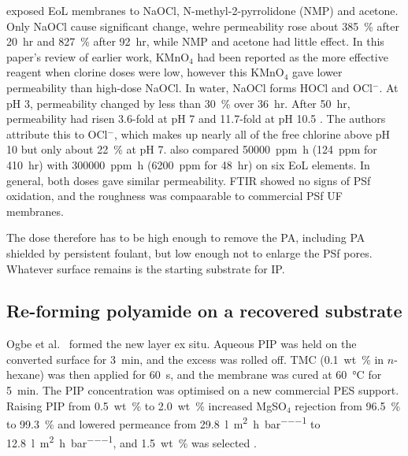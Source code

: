\citet{GarciaPacheco2015} exposed EoL membranes to NaOCl, N-methyl-2-pyrrolidone (NMP) and acetone. Only NaOCl cause significant change, wehre permeability rose about \qty{385}{\percent} after \qty{20}{hr} and \qty{827}{\percent} after \qty{92}{hr}, while NMP and acetone had little effect. In this paper's review of earlier work, KMnO$_4$ had been reported as the more effective reagent when clorine doses were low, however this KMnO$_4$ gave lower permeability than high-dose NaOCl. 
In water, NaOCl forms HOCl and OCl$^-$. At pH 3, permeability changed by less than \qty{30}{\percent} over \qty{36}{hr}. After \qty{50}{hr}, permeability had risen 3.6-fold at pH 7 and 11.7-fold at pH 10.5 \citep{GarciaPacheco2015}. The authors attribute this to OCl$^-$, which makes up nearly all of the free chlorine above pH 10 but only about \qty{22}{\percent} at pH 7.
\citet{Molinaa2018} also compared \qty{50000}{ppm.h} (\qty{124}{ppm} for \qty{410}{hr}) with \qty{300000}{ppm.h} (\qty{6200}{ppm} for \qty{48}{hr}) on six EoL elements. In general, both doses gave similar permeability. FTIR showed no signs of PSf oxidation, and the roughness was compaarable to commercial PSf UF membranes. 

The dose therefore has to be high enough to remove the PA, including PA shielded by persistent foulant, but low enough not to enlarge the PSf pores. Whatever surface remains is the starting substrate for IP.

\subsection{Re-forming polyamide on a recovered substrate}
Ogbe et al.\ \citep{Ogbe2025} formed the new layer ex situ. Aqueous PIP was held on the converted surface for \qty{3}{min}, and the excess was rolled off. TMC (\qty{0.1}{wt\percent} in $n$-hexane) was then applied for \qty{60}{\second}, and the membrane was cured at \qty{60}{\celsius} for \qty{5}{min}. The PIP concentration was optimised on a new commercial PES support. Raising PIP from \qty{0.5}{wt\percent} to \qty{2.0}{wt\percent} increased MgSO$_4$ rejection from \qty{96.5}{\percent} to \qty{99.3}{\percent} and lowered permeance from \qty{29.8}{\litre\per\square\metre\per\hour\per\bar} to \qty{12.8}{\litre\per\square\metre\per\hour\per\bar}, and \qty{1.5}{wt\percent} was selected \citep{Ogbe2025}.


